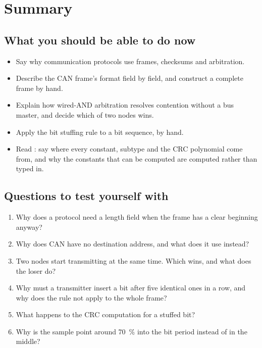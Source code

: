 
\section{Summary}
\label{c10:sec:review}

\subsection*{What you should be able to do now}
\begin{itemize}
  \item Say why communication protocols use frames, checksums and arbitration.
  \item Describe the CAN frame's format field by field, and construct a complete frame by hand.
  \item Explain how wired-AND arbitration resolves contention without a bus master, and decide which
    of two nodes wins.
  \item Apply the bit stuffing rule to a bit sequence, by hand.
  \item Read : say where every constant, subtype and the CRC polynomial come from,
    and why the constants that can be computed are computed rather than typed in.
\end{itemize}

\subsection*{Questions to test yourself with}
\begin{enumerate}
  \item Why does a protocol need a length field when the frame has a clear beginning anyway?
  \item Why does CAN have no destination address, and what does it use instead?
  \item Two nodes start transmitting at the same time. Which wins, and what does the loser do?
  \item Why must a transmitter insert a bit after five identical ones in a row, and why does the
    rule not apply to the whole frame?
  \item What happens to the CRC computation for a stuffed bit?
  \item Why is the sample point around 70~\% into the bit period instead of in the middle?
\end{enumerate}

